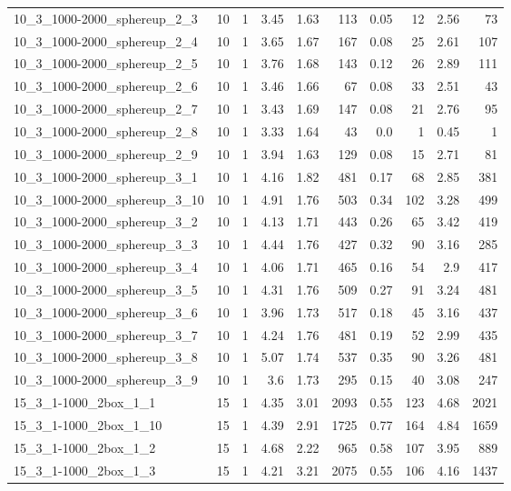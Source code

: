 \begin{center}
\begin{scriptsize}
\begin{longtable}{lrrrrrrrrr}
10\_3\_1000-2000\_sphereup\_2\_3 & 10 & 1 & 3.45 & 1.63 & 113 & 0.05 & 12 & 2.56 & 73\\
10\_3\_1000-2000\_sphereup\_2\_4 & 10 & 1 & 3.65 & 1.67 & 167 & 0.08 & 25 & 2.61 & 107\\
10\_3\_1000-2000\_sphereup\_2\_5 & 10 & 1 & 3.76 & 1.68 & 143 & 0.12 & 26 & 2.89 & 111\\
10\_3\_1000-2000\_sphereup\_2\_6 & 10 & 1 & 3.46 & 1.66 & 67 & 0.08 & 33 & 2.51 & 43\\
10\_3\_1000-2000\_sphereup\_2\_7 & 10 & 1 & 3.43 & 1.69 & 147 & 0.08 & 21 & 2.76 & 95\\
10\_3\_1000-2000\_sphereup\_2\_8 & 10 & 1 & 3.33 & 1.64 & 43 & 0.0 & 1 & 0.45 & 1\\
10\_3\_1000-2000\_sphereup\_2\_9 & 10 & 1 & 3.94 & 1.63 & 129 & 0.08 & 15 & 2.71 & 81\\
10\_3\_1000-2000\_sphereup\_3\_1 & 10 & 1 & 4.16 & 1.82 & 481 & 0.17 & 68 & 2.85 & 381\\
10\_3\_1000-2000\_sphereup\_3\_10 & 10 & 1 & 4.91 & 1.76 & 503 & 0.34 & 102 & 3.28 & 499\\
10\_3\_1000-2000\_sphereup\_3\_2 & 10 & 1 & 4.13 & 1.71 & 443 & 0.26 & 65 & 3.42 & 419\\
10\_3\_1000-2000\_sphereup\_3\_3 & 10 & 1 & 4.44 & 1.76 & 427 & 0.32 & 90 & 3.16 & 285\\
10\_3\_1000-2000\_sphereup\_3\_4 & 10 & 1 & 4.06 & 1.71 & 465 & 0.16 & 54 & 2.9 & 417\\
10\_3\_1000-2000\_sphereup\_3\_5 & 10 & 1 & 4.31 & 1.76 & 509 & 0.27 & 91 & 3.24 & 481\\
10\_3\_1000-2000\_sphereup\_3\_6 & 10 & 1 & 3.96 & 1.73 & 517 & 0.18 & 45 & 3.16 & 437\\
10\_3\_1000-2000\_sphereup\_3\_7 & 10 & 1 & 4.24 & 1.76 & 481 & 0.19 & 52 & 2.99 & 435\\
10\_3\_1000-2000\_sphereup\_3\_8 & 10 & 1 & 5.07 & 1.74 & 537 & 0.35 & 90 & 3.26 & 481\\
10\_3\_1000-2000\_sphereup\_3\_9 & 10 & 1 & 3.6 & 1.73 & 295 & 0.15 & 40 & 3.08 & 247\\
15\_3\_1-1000\_2box\_1\_1 & 15 & 1 & 4.35 & 3.01 & 2093 & 0.55 & 123 & 4.68 & 2021\\
15\_3\_1-1000\_2box\_1\_10 & 15 & 1 & 4.39 & 2.91 & 1725 & 0.77 & 164 & 4.84 & 1659\\
15\_3\_1-1000\_2box\_1\_2 & 15 & 1 & 4.68 & 2.22 & 965 & 0.58 & 107 & 3.95 & 889\\
15\_3\_1-1000\_2box\_1\_3 & 15 & 1 & 4.21 & 3.21 & 2075 & 0.55 & 106 & 4.16 & 1437\\

\end{longtable}
\end{scriptsize}
\end{center}
